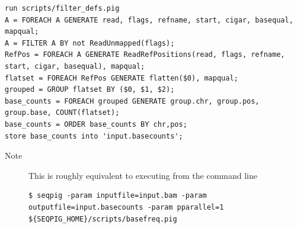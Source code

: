{\begin{lstlisting}
run scripts/filter_defs.pig
A = FOREACH A GENERATE read, flags, refname, start, cigar, basequal, mapqual;
A = FILTER A BY not ReadUnmapped(flags);
RefPos = FOREACH A GENERATE ReadRefPositions(read, flags, refname, start, cigar, basequal), mapqual;
flatset = FOREACH RefPos GENERATE flatten($0), mapqual;
grouped = GROUP flatset BY ($0, $1, $2);
base_counts = FOREACH grouped GENERATE group.chr, group.pos, group.base, COUNT(flatset);
base_counts = ORDER base_counts BY chr,pos;
store base_counts into 'input.basecounts';
\end{lstlisting}
\begin{description}
	\item[Note] This is roughly equivalent to executing from the command line
\begin{lstlisting}
$ seqpig -param inputfile=input.bam -param outputfile=input.basecounts -param pparallel=1 ${SEQPIG_HOME}/scripts/basefreq.pig 
\end{lstlisting}
\end{description}

}
